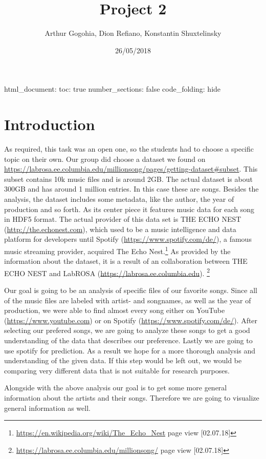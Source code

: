 \documentclass[]{article}
\title{Project 2}
\author{Arthur Gogohia, Dion Refiano, Konstantin Shuxtelinsky}
\date{26/05/2018}
\let\rmarkdownfootnote\footnote%
\def\footnote{\protect\rmarkdownfootnote}
\begin{document}
\maketitle

html\_document: toc: true number\_sections: false code\_folding: hide

\section{Introduction}\label{introduction}

As required, this task was an open one, so the students had to choose a
specific topic on their own. Our group did choose a dataset we found on
\url{https://labrosa.ee.columbia.edu/millionsong/pages/getting-dataset\#subset}.
This subset contains 10k music files and is around 2GB. The actual
dataset is about 300GB and has around 1 million entries. In this case
these are songs. Besides the analysis, the dataset includes some
metadata, like the author, the year of production and so forth. As its
center piece it features music data for each song in HDF5 format. The
actual provider of this data set is THE ECHO NEST
(\url{http://the.echonest.com}), which used to be a music intelligence
and data platform for developers until Spotify
(\url{https://www.spotify.com/de/}), a famous music streaming provider,
acquired The Echo Nest.\footnote{\url{https://en.wikipedia.org/wiki/The_Echo_Nest}
  page view {[}02.07.18{]}} As provided by the information about the
dataset, it is a result of an collaboration between THE ECHO NEST and
LabROSA (\url{https://labrosa.ee.columbia.edu}). \footnote{\url{https://labrosa.ee.columbia.edu/millionsong/}
  page view {[}02.07.18{]}}

Our goal is going to be an analysis of specific files of our favorite
songs. Since all of the music files are labeled with artist- and
songnames, as well as the year of production, we were able to find
almost every song either on YouTube (\url{https://www.youtube.com}) or
on Spotify (\url{https://www.spotify.com/de/}). After selecting our
prefered songs, we are going to analyze these songs to get a good
understanding of the data that describes our preference. Lastly we are
going to use spotify for prediction. As a result we hope for a more
thorough analysis and understanding of the given data. If this step
would be left out, we would be comparing very different data that is not
suitable for research purposes.

Alongside with the above analysis our goal is to get some more general
information about the artists and their songs. Therefore we are going to
visualize general information as well.
\end{document}
